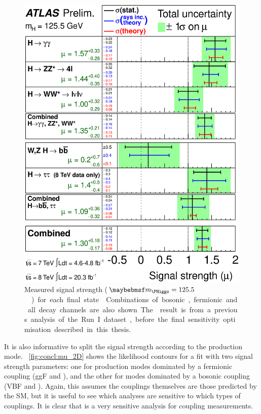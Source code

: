 \begin{figure}[t]
	\includegraphics[width=\mediumfigwidth]{tex/conclusions/atlas_mu}
	\caption{Measured signal strength (\unit{$\mH = 125.5$}{\GeV}) for each final state 
	\cite{ATLAS:couplings:Moriond14}. Combinations of bosonic, fermionic and all decay 
	channels are also shown. The \HWW result is from a previous analysis of the Run~I 
	dataset, before the final sensitivity optimisation described in this thesis.}
	\label{fig:concl:mu}
\end{figure}

It is also informative to split the signal strength according to the production mode. 
\Figure~\ref{fig:concl:mu_2D} shows the likelihood contours for a fit with two signal 
strength parameters: one for production modes dominated by a fermionic coupling (ggF and 
\ttH), and the other for modes dominated by a bosonic coupling (VBF and \VH). Again, this 
assumes the couplings themselves are those predicted by the SM, but it is useful 
to see which analyses are sensitive to which types of couplings. It is clear that \HWW is 
a very sensitive analysis for coupling measurements.

